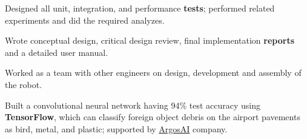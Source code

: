 \documentclass[letterpaper]{deedy-resume} %
\begin{document}
\begin{minipage}[t]{0.66\textwidth}
\begin{tightitemize}
\item Designed all unit, integration, and performance \textbf{tests}; performed related experiments and did the required analyzes.

\item Wrote conceptual design, critical design review, final implementation \textbf{reports} and a detailed user manual.

\item Worked as a team with other engineers on design, development and assembly of the robot.
\end{tightitemize}

\sectionspace %



\begin{tightitemize}
\item Built a convolutional neural network having 94\% test accuracy using \textbf{TensorFlow}, which can classify foreign object debris on the airport pavements as bird, metal, and plastic; supported by \href{https://www.argosai.com/}{ArgosAI} company. 
\end{tightitemize}

\sectionspace %


\sectionspace %


\end{minipage} %
\end{document}
